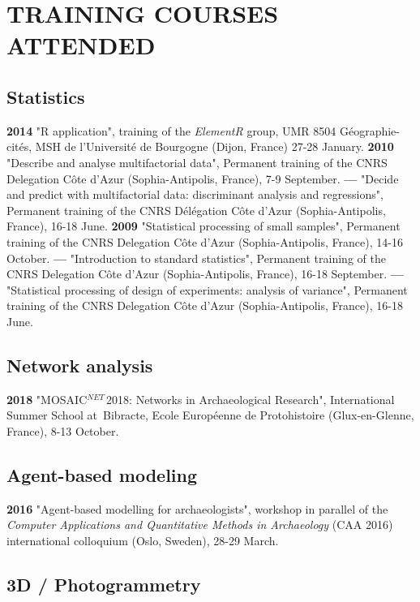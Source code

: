 \documentclass{article}
\begin{document}
\section*{TRAINING COURSES ATTENDED}

\subsection*{Statistics }

\textbf{2014 }"\textsf{R} application", training of the \textit{ElementR} group, UMR 8504 G\'{e}ographie-cit\'{e}s, MSH de l'Universit\'{e} de Bourgogne (Dijon, France) 27-28 January.
\smallbreak
\textbf{2010 }"Describe and analyse multifactorial data", Permanent training of the CNRS Delegation C\^{o}te d'Azur (Sophia-Antipolis, France), 7-9 September.
\smallbreak
\textbf{--- }"Decide and predict with multifactorial data: discriminant analysis and regressions", Permanent training of the CNRS D\'{e}l\'{e}gation C\^{o}te d'Azur (Sophia-Antipolis, France), 16-18 June.
\smallbreak
\textbf{2009 }"Statistical processing of small samples", Permanent training of the CNRS Delegation C\^{o}te d'Azur (Sophia-Antipolis, France), 14-16 October.
\smallbreak
\textbf{--- }"Introduction to standard statistics", Permanent training of the CNRS Delegation C\^{o}te d'Azur (Sophia-Antipolis, France), 16-18 September.
\smallbreak
\textbf{--- }"Statistical processing of design of experiments: analysis of variance", Permanent training of the CNRS Delegation C\^{o}te d'Azur (Sophia-Antipolis, France), 16-18 June.
\smallbreak

\subsection*{Network analysis}

\textbf{2018 }"MOSAIC${}^{NET\ }$2018: Networks in Archaeological Research", International Summer School at~Bibracte, Ecole Europ\'{e}enne de Protohistoire (Glux-en-Glenne, France), 8-13 October.

\subsection*{Agent-based modeling}

\textbf{2016 }"Agent-based modelling for archaeologists", workshop in parallel of the \textit{Computer Applications and Quantitative Methods in Archaeology} (CAA 2016) international colloquium (Oslo, Sweden), 28-29 March.

\subsection*{3D / Photogrammetry}
\end{document}
